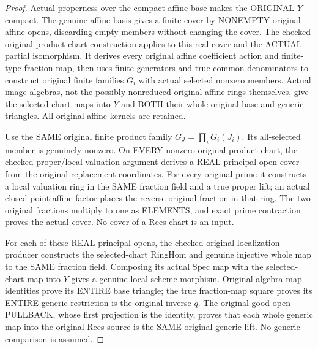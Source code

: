 \begin{proof}
Actual properness over the compact affine base makes the ORIGINAL $Y$
compact.  The genuine affine basis gives a finite cover by NONEMPTY original
affine opens, discarding empty members without changing the cover.  The
checked original product-chart construction applies to this real cover and
the ACTUAL partial isomorphism.  It derives every original affine coefficient
action and finite-type fraction map, then uses finite generators and true
common denominators to construct original finite families $G_i$ with actual
selected nonzero members.  Actual image algebras, not the possibly nonreduced
original affine rings themselves, give the selected-chart maps into $Y$ and
BOTH their whole original base and generic triangles.  All original affine
kernels are retained.

Use the SAME original finite product family
$G_J=\prod_iG_i(J_i)$.  Its all-selected member is genuinely nonzero.  On
EVERY nonzero original product chart, the checked proper/local-valuation
argument derives a REAL principal-open cover from the original replacement
coordinates.  For every original prime it constructs a local valuation ring
in the SAME fraction field and a true proper lift; an actual closed-point
affine factor places the reverse original fraction in that ring.  The two
original fractions multiply to one as ELEMENTS, and exact prime contraction
proves the actual cover.  No cover of a Rees chart is an input.

For each of these REAL principal opens, the checked original localization
producer constructs the selected-chart RingHom and genuine injective whole
map to the SAME fraction field.  Composing its actual Spec map with the
selected-chart map into $Y$ gives a genuine local scheme morphism.  Original
algebra-map identities prove its ENTIRE base triangle; the true fraction-map
square proves its ENTIRE generic restriction is the original inverse $q$.
The original good-open PULLBACK, whose first projection is the identity,
proves that each whole generic map into the original Rees source is the
SAME original generic lift.  No generic comparison is assumed.


\end{proof}
